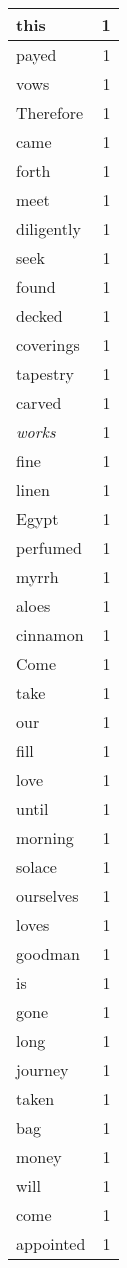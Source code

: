 \begin{center}
\begin{longtable}{l|r}
this & 1\\ \hline 
payed & 1\\ \hline 
vows & 1\\ \hline 
Therefore & 1\\ \hline 
came & 1\\ \hline 
forth & 1\\ \hline 
meet & 1\\ \hline 
diligently & 1\\ \hline 
seek & 1\\ \hline 
found & 1\\ \hline 
decked & 1\\ \hline 
coverings & 1\\ \hline 
tapestry & 1\\ \hline 
carved & 1\\ \hline 
\emph{works} & 1\\ \hline 
fine & 1\\ \hline 
linen & 1\\ \hline 
Egypt & 1\\ \hline 
perfumed & 1\\ \hline 
myrrh & 1\\ \hline 
aloes & 1\\ \hline 
cinnamon & 1\\ \hline 
Come & 1\\ \hline 
take & 1\\ \hline 
our & 1\\ \hline 
fill & 1\\ \hline 
love & 1\\ \hline 
until & 1\\ \hline 
morning & 1\\ \hline 
solace & 1\\ \hline 
ourselves & 1\\ \hline 
loves & 1\\ \hline 
goodman & 1\\ \hline 
is & 1\\ \hline 
gone & 1\\ \hline 
long & 1\\ \hline 
journey & 1\\ \hline 
taken & 1\\ \hline 
bag & 1\\ \hline 
money & 1\\ \hline 
will & 1\\ \hline 
come & 1\\ \hline 
appointed & 1\\ \hline 

\end{longtable}
\end{center}
